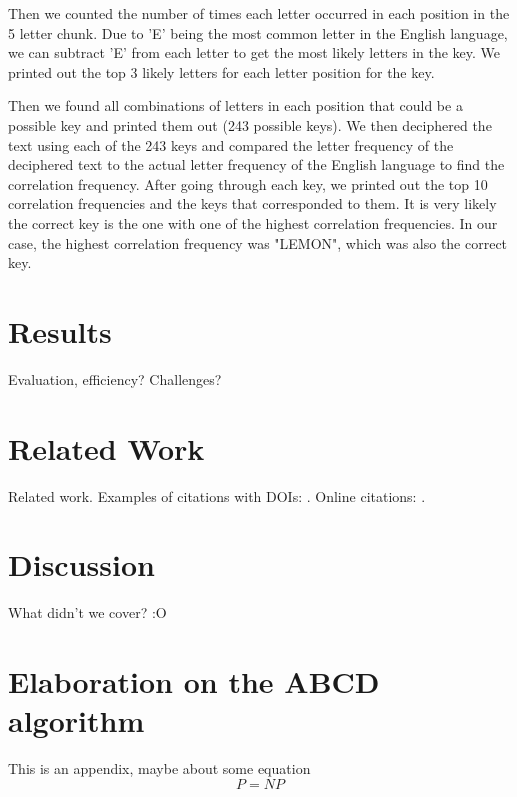 \documentclass[acmlarge]{acmart}
\begin{document}
Then we counted the number of times each letter occurred in each position in the 5 letter chunk. Due to 'E' being the most common letter in the English language, we can subtract 'E' from each letter to get the most likely letters in the key. We printed out the top 3 likely letters for each letter position for the key.

Then we found all combinations of letters in each position that could be a possible key and printed them out (243 possible keys). We then deciphered the text using each of the 243 keys and compared the letter frequency of the deciphered text to the actual letter frequency of the English language to find the correlation frequency. After going through each key, we printed out the top 10 correlation frequencies and the keys that corresponded to them. It is very likely the correct key is the one with one of the highest correlation frequencies. In our case, the highest correlation frequency was "LEMON", which was also the correct key.

\section{Results}\label{sec:results}

Evaluation, efficiency? Challenges?

\section{Related Work}\label{sec:relatedwork}

Related work. Examples of citations with DOIs: \cite{2004:ITE:1009386.1010128, Kirschmer:2010:AEI:1958016.1958018}. Online citations: \cite{TUGInstmem, Thornburg01, CTANacmart}.

\section{Discussion}\label{sec:discussion}

What didn't we cover? :O

\appendix
\section{Elaboration on the ABCD algorithm}

This is an appendix, maybe about some equation
\begin{displaymath}
P=NP
\end{displaymath}
\end{document}
